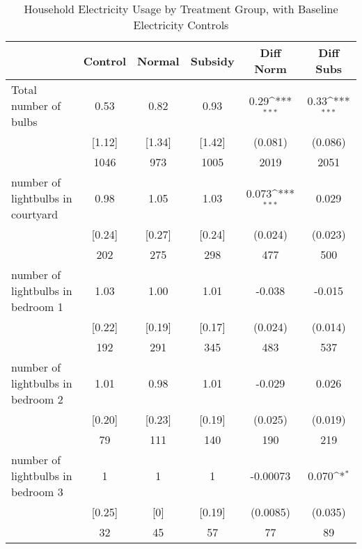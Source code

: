 \begin{table}[htbp]\centering
\def\sym#1{\ifmmode^{#1}\else\(^{#1}\)\fi}
\caption{Household Electricity Usage by Treatment Group, with Baseline Electricity Controls \label{tab:"balance"}}
\begin{tabular*}{0.9\hsize}{@{\hskip\tabcolsep\extracolsep\fill}l*{1}{ccccc}}
\toprule
                                &  Control&   Normal&  Subsidy&Diff Norm         &Diff Subs         \\
\midrule
Total number of bulbs           &     0.53&     0.82&     0.93&     0.29\sym{***}&     0.33\sym{***}\\
                                &   [1.12]&   [1.34]&   [1.42]&  (0.081)         &  (0.086)         \\
                                &     1046&      973&     1005&     2019         &     2051         \\
number of lightbulbs in courtyard&     0.98&     1.05&     1.03&    0.073\sym{***}&    0.029         \\
                                &   [0.24]&   [0.27]&   [0.24]&  (0.024)         &  (0.023)         \\
                                &      202&      275&      298&      477         &      500         \\
number of lightbulbs in bedroom 1&     1.03&     1.00&     1.01&   -0.038         &   -0.015         \\
                                &   [0.22]&   [0.19]&   [0.17]&  (0.024)         &  (0.014)         \\
                                &      192&      291&      345&      483         &      537         \\
number of lightbulbs in bedroom 2&     1.01&     0.98&     1.01&   -0.029         &    0.026         \\
                                &   [0.20]&   [0.23]&   [0.19]&  (0.025)         &  (0.019)         \\
                                &       79&      111&      140&      190         &      219         \\
number of lightbulbs in bedroom 3&        1&        1&        1& -0.00073         &    0.070\sym{*}  \\
                                &   [0.25]&      [0]&   [0.19]& (0.0085)         &  (0.035)         \\
                                &       32&       45&       57&       77         &       89         \\

\end{tabular*}
\end{table}
